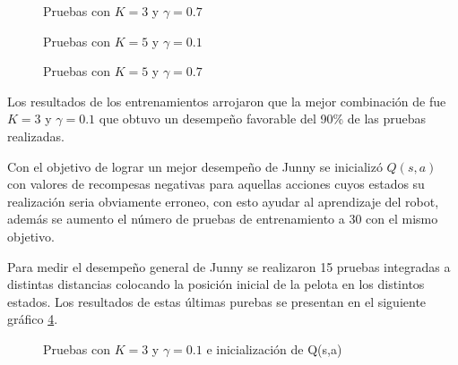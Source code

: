 \begin{figure}[h]
\caption{Pruebas con $K = 3$ y $ \gamma = 0.7 $}
\label{fig:k3y7}
\end{figure} 

\begin{figure}[h]
\caption{Pruebas con $K = 5$ y $ \gamma = 0.1 $}
\label{fig:k5y1}
\end{figure} 

\begin{figure}[h]
\caption{Pruebas con $K = 5$ y $ \gamma = 0.7 $}
\label{fig:k5y7}
\end{figure} 

Los resultados de los entrenamientos arrojaron que la mejor combinaci\'on de fue  $K = 3$ y $ \gamma = 0.1 $ que obtuvo un desempeño favorable del 90\% de las pruebas realizadas.

Con el objetivo de lograr un mejor desempeño de Junny se inicializ\'o $Q(s,a)$ con valores de recompesas negativas para aquellas acciones cuyos estados su realizaci\'on seria obviamente erroneo, con esto ayudar al aprendizaje del robot, adem\'as se aumento el n\'umero de pruebas de entrenamiento a 30 con el mismo objetivo.   

Para medir el desempeño general de Junny se realizaron 15 pruebas integradas a distintas distancias colocando la posici\'on inicial de la pelota en los distintos estados. Los resultados de estas \'ultimas purebas se presentan en el siguiente gr\'afico \ref{fig:mejor}. 

\begin{figure}[h]
\caption{Pruebas con $K = 3$ y $ \gamma = 0.1 $ e inicializaci\'on de Q(s,a)}
\label{fig:mejor}
\end{figure} 

